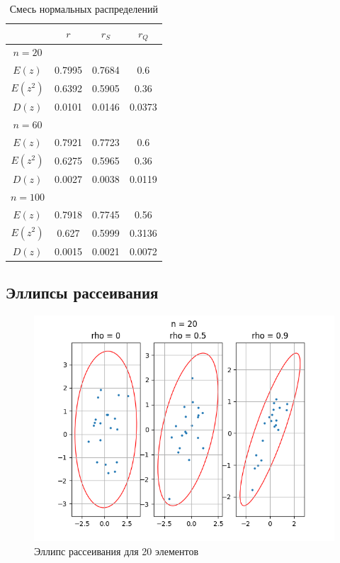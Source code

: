 \documentclass[../main.tex]{subfiles}
\begin{document}
    \begin{table}[H]
        \centering
        \begin{tabular}{|c|c|c|c|}
            \hline
            & $r$ & $r_S$ & $r_Q$\\\hline
            $n=20$ & & &\\\hline
            $E(z)$ & 0.7995 & 0.7684 & 0.6\\\hline
            $E(z^2)$ & 0.6392 & 0.5905 & 0.36\\\hline
            $D(z)$ & 0.0101 & 0.0146 & 0.0373\\\hline
            \hline
            $n=60$ & & &\\\hline
            $E(z)$ & 0.7921 & 0.7723 & 0.6\\\hline
            $E(z^2)$ & 0.6275 & 0.5965 & 0.36\\\hline
            $D(z)$ & 0.0027 & 0.0038 & 0.0119\\\hline
            \hline
            $n=100$ & & &\\\hline
            $E(z)$ & 0.7918 & 0.7745 & 0.56\\\hline
            $E(z^2)$ & 0.627 & 0.5999 & 0.3136\\\hline
            $D(z)$ & 0.0015 & 0.0021 & 0.0072\\\hline
        \end{tabular}
        \caption{Смесь нормальных распределений}
    \end{table}
    
    \subsection{Эллипсы рассеивания}
    \begin{figure}[H]
        \centering
        \includegraphics[scale=0.85]{figures/elipse20.png}
        \caption{Эллипс рассеивания для 20 элементов}
    \end{figure}
    
\end{document}

